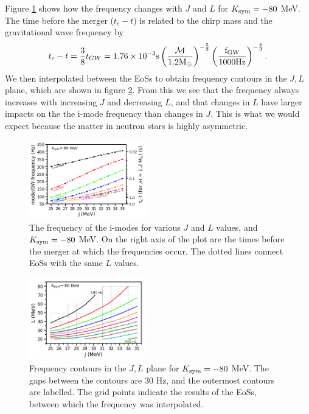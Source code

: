 \documentclass[fleqn,usenatbib]{mnras}
\begin{document}
Figure \ref{fig:J_vs_L_vs_f+tc} shows how the frequency changes with $J$ and $L$ for $K_{\rm sym}=-80$ MeV. The time before the merger ($t_c-t$) is related to the chirp mass and the gravitational wave frequency by \citep{blanchet2006gravitational} %
\begin{align}
t_c-t=\frac{3}{8}t_{GW}=1.76\times 10^{-3}\rm{s}\left(\frac{\mathcal{M}}{1.2M_{\odot}}\right)^{-\frac{5}{3}}\left(\frac{f_{GW}}{1000 \rm{Hz}}\right)^{-\frac{8}{3}}.
\label{eq:t_before_merger}
\end{align}
\noindent We then interpolated between the EoSs to obtain frequency contours in the $J,L$ plane, which are shown in figure \ref{fig:freq_contours}. From this we see that the frequency always increases with increasing $J$ and decreasing $L$, and that changes in $L$ have larger impacts on the the i-mode frequency than changes in $J$. This is what we would expect because the matter in neutron stars is highly asymmetric.


\begin{figure}
\centering
\includegraphics[width=0.45\textwidth,angle=0]{J_L_f_tc_K-80.png}
\caption{The frequency of the i-modes for various $J$ and $L$ values, and $K_{\rm sym}=-80$ MeV. On the right axis of the plot are the times before the merger at which the frequencies occur. The dotted lines connect EoSs with the same $L$ values.}
\label{fig:J_vs_L_vs_f+tc}
\end{figure}

\begin{figure}
\centering
\includegraphics[width=0.45\textwidth,angle=0]{J_L_contour_K-80.png}
\caption{Frequency contours in the $J,L$ plane for $K_{\rm sym}=-80$ MeV. The gaps between the contours are $30$ Hz, and the outermost contours are labelled. The grid points indicate the results of the EoSs, between which the frequency was interpolated.}
\label{fig:freq_contours}
\end{figure}
\end{document}

